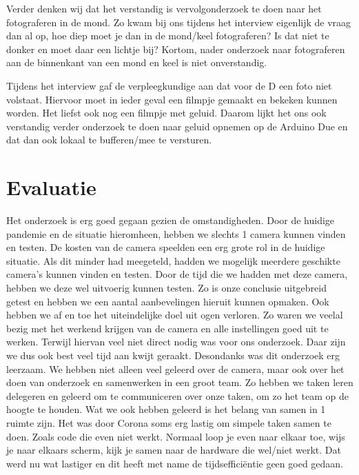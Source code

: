\documentclass{article}
\begin{document}
Verder denken wij dat het verstandig is vervolgonderzoek te doen naar het fotograferen in de mond. Zo kwam bij ons tijdens het interview eigenlijk de vraag dan al op, hoe diep moet je dan in de mond/keel fotograferen? Is dat niet te donker en moet daar een lichtje bij? Kortom, nader onderzoek naar fotograferen aan de binnenkant van een mond en keel is niet onverstandig.

Tijdens het interview gaf de verpleegkundige aan dat voor de D een foto niet volstaat. Hiervoor moet in ieder geval een filmpje gemaakt en bekeken kunnen worden. Het liefst ook nog een filmpje met geluid. Daarom lijkt het ons ook verstandig verder onderzoek te doen naar geluid opnemen op de Arduino Due en dat dan ook lokaal te bufferen/mee te versturen.


\section{Evaluatie}
Het onderzoek is erg goed gegaan gezien de omstandigheden. Door de huidige pandemie en de situatie hieromheen, hebben we slechts 1 camera kunnen vinden en testen.
De kosten van de camera speelden een erg grote rol in de huidige situatie. Als dit minder had meegeteld, hadden we mogelijk meerdere geschikte camera’s kunnen vinden en testen.
Door de tijd die we hadden met deze camera, hebben we deze wel uitvoerig kunnen testen. 
Zo is onze conclusie uitgebreid getest en hebben we een aantal aanbevelingen hieruit kunnen opmaken. 
Ook hebben we af en toe het uiteindelijke doel uit ogen verloren. Zo waren we veelal bezig met het werkend krijgen van de camera en alle instellingen goed uit te werken. Terwijl hiervan veel niet direct nodig was voor ons onderzoek. Daar zijn we dus ook best veel tijd aan kwijt geraakt. 
Desondanks was dit onderzoek erg leerzaam. We hebben niet alleen veel geleerd over de camera, maar ook over het doen van onderzoek en samenwerken in een groot team. Zo hebben we taken leren delegeren en geleerd om te communiceren over onze taken, om zo het team op de hoogte te houden. 
Wat we ook hebben geleerd is het belang van samen in 1 ruimte zijn. Het was door Corona soms erg lastig om simpele taken samen te doen. Zoals code die even niet werkt. Normaal loop je even naar elkaar toe, wijs je naar elkaars scherm, kijk je samen naar de hardware die wel/niet werkt. Dat werd nu wat lastiger en dit heeft met name de tijdsefficiëntie geen goed gedaan.
\end{document}

